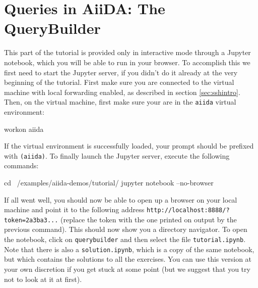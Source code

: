 
\section{Queries in AiiDA: The QueryBuilder}
\label{sec:querybuilder}

\begin{tcolorbox}
This part of the tutorial is provided only in interactive mode through a Jupyter notebook, which you will be able to run in your browser.
To accomplish this we first need to start the Jupyter server, if you didn't do it already at the very beginning of the tutorial.
First make sure you are connected to the virtual machine with local forwarding enabled, as described in section \ref{sec:sshintro}.
Then, on the virtual machine, first make sure your are in the \texttt{aiida} virtual environment:

\begin{bashcommand}
workon aiida
\end{bashcommand}

If the virtual environment is successfully loaded, your prompt should be prefixed with \texttt{(aiida)}.
To finally launch the Jupyter server, execute the following commands:

\begin{bashcommand}
cd ~/examples/aiida-demos/tutorial/
jupyter notebook --no-browser
\end{bashcommand}

If all went well, you should now be able to open up a browser on your local machine and point it to the following address \texttt{http://localhost:8888/?token=2a3ba3...} (replace the token with the one printed on output by the previous command).
This should now show you a directory navigator.
To open the notebook, click on \texttt{querybuilder} and then select the file \texttt{tutorial.ipynb}.
Note that there is also a \texttt{solution.ipynb}, which is a copy of the same notebook, but which contains the solutions to all the exercises.
You can use this version at your own discretion if you get stuck at some point (but we suggest that you try not to look at it at first).
\end{tcolorbox}
